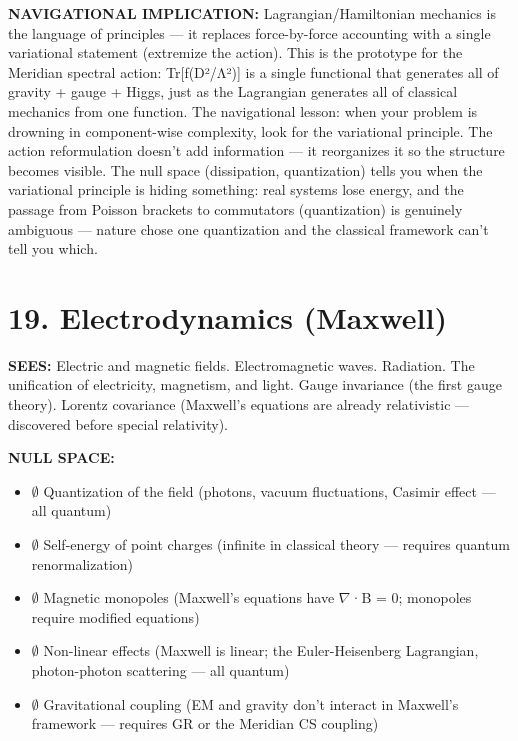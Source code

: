 \textbf{NAVIGATIONAL IMPLICATION:} Lagrangian/Hamiltonian mechanics is the language of principles — it replaces force-by-force accounting with a single variational statement (extremize the action). This is the prototype for the Meridian spectral action: Tr[f(D²/Λ²)] is a single functional that generates all of gravity + gauge + Higgs, just as the Lagrangian generates all of classical mechanics from one function. The navigational lesson: when your problem is drowning in component-wise complexity, look for the variational principle. The action reformulation doesn't add information — it reorganizes it so the structure becomes visible. The null space (dissipation, quantization) tells you when the variational principle is hiding something: real systems lose energy, and the passage from Poisson brackets to commutators (quantization) is genuinely ambiguous — nature chose one quantization and the classical framework can't tell you which.


\bigskip\noindent\makebox[\textwidth]{\color{rulegray}\rule{5cm}{0.3pt}}\bigskip


\section*{19. Electrodynamics (Maxwell)}


\textbf{SEES:} Electric and magnetic fields. Electromagnetic waves. Radiation. The unification of electricity, magnetism, and light. Gauge invariance (the first gauge theory). Lorentz covariance (Maxwell's equations are already relativistic — discovered before special relativity).


\textbf{NULL SPACE:}

\begin{itemize}[nosep,leftmargin=*]
  \item $\emptyset$ Quantization of the field (photons, vacuum fluctuations, Casimir effect — all quantum)
  \item $\emptyset$ Self-energy of point charges (infinite in classical theory — requires quantum renormalization)
  \item $\emptyset$ Magnetic monopoles (Maxwell's equations have $\nabla$·B = 0; monopoles require modified equations)
  \item $\emptyset$ Non-linear effects (Maxwell is linear; the Euler-Heisenberg Lagrangian, photon-photon scattering — all quantum)
  \item $\emptyset$ Gravitational coupling (EM and gravity don't interact in Maxwell's framework — requires GR or the Meridian CS coupling)
\end{itemize}


